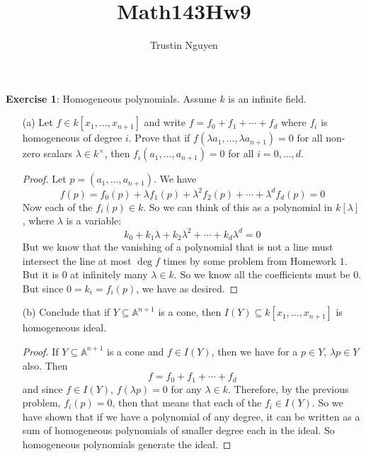 \documentclass{article}
\title{Math143Hw9}
\author{Trustin Nguyen}
\begin{document}
    \maketitle

\reversemarginpar

\textbf{Exercise 1}: Homogeneous polynomials. Assume $k$ is an infinite field.
    \begin{itemize}
        \item [(a)] Let $f \in k[x_{1}, \ldots, x_{n + 1}]$ and write $f = f_{0} + f_{1} + \cdots + f_{d}$ where $f_{i}$ is homogeneous of degree $i$. Prove that if $f(\lambda a_{1}, \ldots, \lambda a_{n + 1}) = 0$ for all non-zero scalars $\lambda \in k^{\times}$, then $f_{i}(a_{1}, \ldots, a_{n + 1}) = 0$ for all $i  = 0, \ldots, d$.
            \begin{proof}
                Let $p = (a_{1}, \ldots, a_{n + 1})$. We have
                    \begin{equation*}
                        f(p) = f_{0}(p) + \lambda f_{1}(p) + \lambda^{2}f_{2}(p) + \cdots + \lambda^{d}f_{d}(p) = 0
                    \end{equation*}
                Now each of the $f_{i}(p) \in k$. So we can think of this as a polynomial in $k[\lambda]$, where $\lambda$ is a variable:
                    \begin{equation*}
                        k_{0} + k_{1}\lambda + k_{2}\lambda^{2} + \cdots + k_{d}\lambda^{d} = 0
                    \end{equation*}
                But we know that the vanishing of a polynomial that is not a line must intersect the line at most $\deg f$ times by some problem from Homework $1$. But it is $0$ at infinitely many $\lambda \in k$. So we know all the coefficients must be $0$. But since $0 = k_{i} = f_{i}(p)$, we have as desired.
            \end{proof}

        \item [(b)] Conclude that if $Y \subseteq \mathbb{A}^{n + 1}$ is a cone, then $I(Y) \subseteq k[x_{1}, \ldots, x_{n + 1}]$ is homogeneous ideal.
            \begin{proof}
                If $Y \subseteq \mathbb{A}^{n + 1}$ is a cone and $f \in I(Y)$, then we have for a $p \in Y$, $\lambda p \in Y$ also. Then 
                    \begin{equation*}
                        f = f_{0} + f_{1} + \cdots + f_{d}
                    \end{equation*}
                and since $f \in I(Y)$, $f(\lambda p) = 0$ for any $\lambda \in k$. Therefore, by the previous problem, $f_{i}(p) = 0$, then that means that each of the $f_{i} \in I(Y)$. So we have shown that if we have a polynomial of any degree, it can be written as a sum of homogeneous polynomials of smaller degree each in the ideal. So homogeneous polynomials generate the ideal.
            \end{proof}
    \end{itemize}
\end{document}
